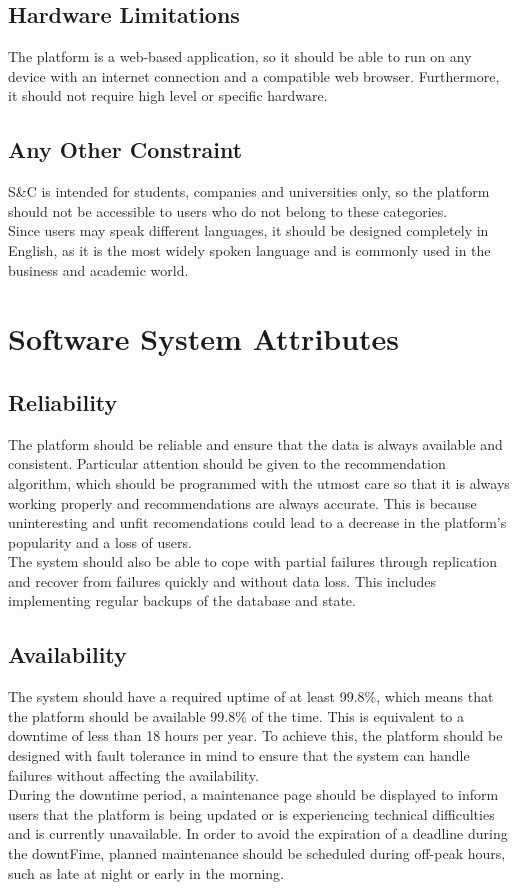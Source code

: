 \subsection{Hardware Limitations}
The platform is a web-based application, so it should be able to run on any device with an internet connection and a compatible web browser. 
Furthermore, it should not require high level or specific hardware.

\subsection{Any Other Constraint}
S\&C is intended for students, companies and universities only, so the platform should not be accessible to users who do not belong to these
categories. \\
Since users may speak different languages, it should be designed completely in English, as it is the most widely spoken language and is commonly 
used in the business and academic world.



\section{Software System Attributes}
\subsection{Reliability}
The platform should be reliable and ensure that the data is always available and consistent. Particular attention should be given to the
recommendation algorithm, which should be programmed with the utmost care so that it is always working properly and recommendations are always accurate. 
This is because uninteresting and unfit recomendations could lead to a decrease in the platform's popularity and a loss of users. \\
The system should also be able to cope with partial failures through replication and recover from failures quickly and without data loss. 
This includes implementing regular backups of the database and state.

\subsection{Availability}
The system should have a required uptime of at least 99.8\%, which means that the platform should be available 99.8\% of the time. 
This is equivalent to a downtime of less than 18 hours per year. To achieve this, the platform should be designed with fault tolerance 
in mind to ensure that the system can handle failures without affecting the availability. \\
During the downtime period, a maintenance page should be displayed to inform users that the platform is being updated or is experiencing
technical difficulties and is currently unavailable. In order to avoid the expiration of a deadline during the downtFime, planned maintenance 
should be scheduled during off-peak hours, such as late at night or early in the morning.

